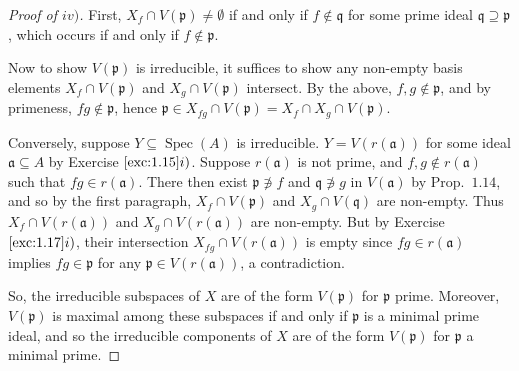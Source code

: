 \documentclass[12pt,letterpaper]{article}
\theoremstyle{definition}
\theoremstyle{remark}
\numberwithin{figure}{problem}
\numberwithin{equation}{section}
\DeclareMathOperator{\Spec}{Spec}
\begin{document}
\begin{proof}[Proof of
  $iv)$]
  First,
  $X_f \cap V(\mathfrak{p}) \ne
  \emptyset$ if and only if
  $f \notin
  \mathfrak{q}$ for some prime ideal
  $\mathfrak{q} \supseteq
  \mathfrak{p}$, which occurs if and only if
  $f \notin
  \mathfrak{p}$.
  \par Now to show
  $V(\mathfrak{p})$ is irreducible, it suffices to show any non-empty basis elements
  $X_f \cap
  V(\mathfrak{p})$ and
  $X_g \cap
  V(\mathfrak{p})$ intersect.
  By the above,
  $f,g \notin
  \mathfrak{p}$, and by primeness,
  $fg \notin
  \mathfrak{p}$, hence
  $\mathfrak{p} \in X_{fg} \cap V(\mathfrak{p}) = X_f \cap X_g \cap
  V(\mathfrak{p})$.
  \par Conversely, suppose
  $Y \subseteq
  \Spec(A)$ is irreducible.
  $Y =
  V(r(\mathfrak{a}))$ for some ideal
  $\mathfrak{a} \subseteq
  A$ by Exercise
  $\ref{exc:1.15}i)$.
  Suppose
  $r(\mathfrak{a})$ is not prime, and
  $f,g \notin
  r(\mathfrak{a})$ such that
  $fg \in
  r(\mathfrak{a})$.
  There then exist
  $\mathfrak{p} \not\ni
  f$ and
  $\mathfrak{q} \not\ni
  g$ in
  $V(\mathfrak{a})$ by
  Prop.~$1.14$, and so by the first paragraph,
  $X_f \cap
  V(\mathfrak{p})$ and
  $X_g \cap
  V(\mathfrak{q})$ are non-empty.
  Thus
  $X_f \cap
  V(r(\mathfrak{a}))$ and
  $X_g \cap
  V(r(\mathfrak{a}))$ are non-empty.
  But by Exercise
  $\ref{exc:1.17}i)$, their intersection
  $X_{fg} \cap
  V(r(\mathfrak{a}))$ is empty since
  $fg \in
  r(\mathfrak{a})$ implies
  $fg \in
  \mathfrak{p}$ for any
  $\mathfrak{p} \in
  V(r(\mathfrak{a}))$, a contradiction.
  \par So, the irreducible subspaces of
  $X$ are of the form
  $V(\mathfrak{p})$ for
  $\mathfrak{p}$ prime.
  Moreover,
  $V(\mathfrak{p})$ is maximal among these subspaces if and only if
  $\mathfrak{p}$ is a minimal prime ideal, and so the irreducible components of
  $X$ are of the form
  $V(\mathfrak{p})$ for
  $\mathfrak{p}$ a minimal prime.
\end{proof}
\end{document}
